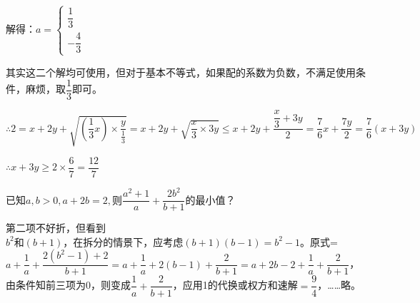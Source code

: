 \documentclass[CJKmath]{ctexart}
\begin{document}
解得：$a=\begin{cases}
\dfrac{1}{3}\\
-\dfrac{4}{3}
\end{cases}
$

其实这二个解均可使用，但对于基本不等式，如果配的系数为负数，不满足使用条件，麻烦，取$\dfrac{1}{3}$即可。

$\therefore 2= x+2y+\sqrt{(\dfrac{1}{3}x)\times\dfrac{y}{\frac{1}{3}}}=x+2y+\sqrt{\dfrac{x}{3}\times 3y}\le x+2y+\dfrac{\dfrac{x}{3}+3y}{2}=\dfrac{7}{6}x+\dfrac{7y}{2}=\dfrac{7}{6}(x+3y)$

$\therefore x+3y\ge 2\times\dfrac{6}{7}=\dfrac{12}{7}$
\rmfamily
\begin{example}
$已知a,b>0,a+2b=2,则\dfrac{a^2+1}{a}+\dfrac{2b^2}{b+1}$的最小值？
\end{example}
第二项不好折，但看到$b^2和(b+1)，在拆分的情景下，应考虑(b+1)(b-1)=b^2-1$。原式=$a+\dfrac{1}{a}+\dfrac{2(b^2-1)+2}{b+1}=a+\dfrac{1}{a}+2(b-1)+\dfrac{2}{b+1}=a+2b-2+\dfrac{1}{a}+\dfrac{2}{b+1}$，由条件知前三项为0，则变成$\dfrac{1}{a}+\dfrac{2}{b+1}$，应用1的代换或权方和速解$=\dfrac{9}{4}$，……略。
\end{document}
